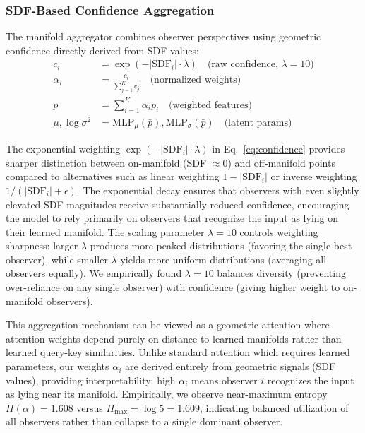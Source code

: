 \documentclass[10pt,twocolumn,letterpaper]{article}
\begin{document}
\subsubsection{SDF-Based Confidence Aggregation}
\label{sec:aggregation}

The manifold aggregator combines observer perspectives using geometric confidence directly derived from SDF values:
\begin{align}
c_i &= \exp(-|\text{SDF}_i| \cdot \lambda) \quad \text{(raw confidence, $\lambda=10$)} \label{eq:confidence} \\
\alpha_i &= \frac{c_i}{\sum_{j=1}^K c_j} \quad \text{(normalized weights)} \label{eq:weights} \\
\bar{p} &= \sum_{i=1}^K \alpha_i p_i \quad \text{(weighted features)} \label{eq:aggregation} \\
\mu, \log \sigma^2 &= \text{MLP}_\mu(\bar{p}), \text{MLP}_\sigma(\bar{p}) \quad \text{(latent params)} \label{eq:latent_params}
\end{align}

The exponential weighting $\exp(-|\text{SDF}_i| \cdot \lambda)$ in Eq.~\ref{eq:confidence} provides sharper distinction between on-manifold (SDF $\approx 0$) and off-manifold points compared to alternatives such as linear weighting $1 - |\text{SDF}_i|$ or inverse weighting $1/(|\text{SDF}_i| + \epsilon)$. The exponential decay ensures that observers with even slightly elevated SDF magnitudes receive substantially reduced confidence, encouraging the model to rely primarily on observers that recognize the input as lying on their learned manifold. The scaling parameter $\lambda=10$ controls weighting sharpness: larger $\lambda$ produces more peaked distributions (favoring the single best observer), while smaller $\lambda$ yields more uniform distributions (averaging all observers equally). We empirically found $\lambda=10$ balances diversity (preventing over-reliance on any single observer) with confidence (giving higher weight to on-manifold observers).

This aggregation mechanism can be viewed as a geometric attention where attention weights depend purely on distance to learned manifolds rather than learned query-key similarities. Unlike standard attention which requires learned parameters, our weights $\alpha_i$ are derived entirely from geometric signals (SDF values), providing interpretability: high $\alpha_i$ means observer $i$ recognizes the input as lying near its manifold. Empirically, we observe near-maximum entropy $H(\alpha) = 1.608$ versus $H_{\max} = \log 5 = 1.609$, indicating balanced utilization of all observers rather than collapse to a single dominant observer.
\end{document}
